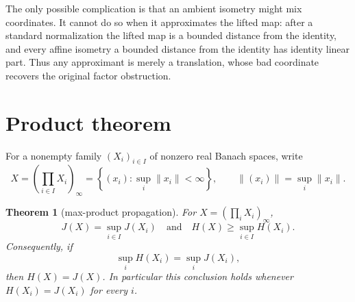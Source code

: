\documentclass[11pt]{article}
\newtheorem{theorem}{Theorem}
\begin{document}
The only possible complication is that an ambient isometry might mix
coordinates.  It cannot do so when it approximates the lifted map: after a
standard normalization the lifted map is a bounded distance from the
identity, and every affine isometry a bounded distance from the identity has
identity linear part.  Thus any approximant is merely a translation, whose
bad coordinate recovers the original factor obstruction.

\section{Product theorem}

For a nonempty family $(X_i)_{i\in I}$ of nonzero real Banach spaces, write
\[
 X=\left(\prod_{i\in I}X_i\right)_\infty
 =\left\{(x_i):\sup_i\|x_i\|<\infty\right\},
 \qquad \|(x_i)\|=\sup_i\|x_i\|.
\]

\begin{theorem}[max-product propagation]\label{thm:product}
For $X=(\prod_iX_i)_\infty$,
\[
 J(X)=\sup_{i\in I}J(X_i)
 \quad\text{and}\quad
 H(X)\geq\sup_{i\in I}H(X_i).
\]
Consequently, if
\[
 \sup_iH(X_i)=\sup_iJ(X_i),
\]
then $H(X)=J(X)$.  In particular this conclusion holds whenever
$H(X_i)=J(X_i)$ for every $i$.
\end{theorem}
\end{document}
